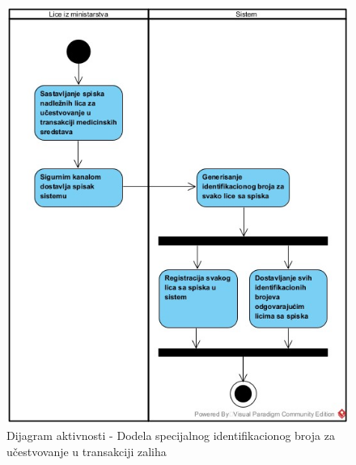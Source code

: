 \documentclass[titlepage]{article}
\begin{document}
\begin{figure}[H]
\centering
\includegraphics[scale=0.5]{DodelaIDZaTransakcijuZaliha}
\caption{Dijagram aktivnosti -  Dodela specijalnog identifikacionog broja za u\v{c}estvovanje u transakciji zaliha}
\end{figure}
\end{document}
